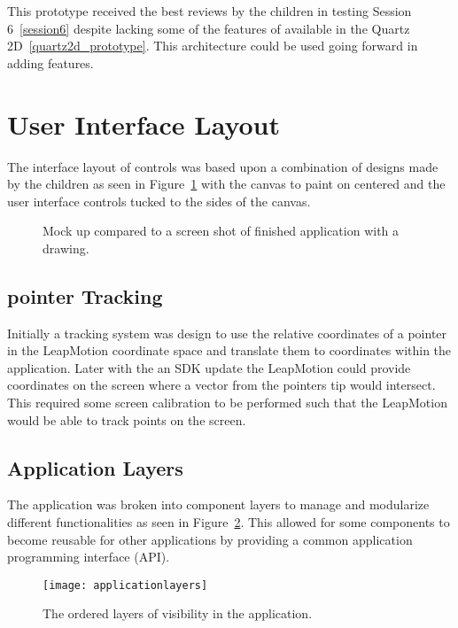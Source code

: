 This prototype received the best reviews by the children in testing Session 6~\ref{session6} despite lacking some of the features of available in the Quartz 2D~\ref{quartz2d_prototype}. This architecture could be used going forward in adding features.



\section{User Interface Layout}
The interface layout of controls was based upon a combination of designs made by the children as seen in Figure~\ref{fig:LeapPaintScreenshot} with the canvas to paint on centered and the user interface controls tucked to the sides of the canvas. 


\begin{figure}
\centering     %
{}
\caption{Mock up compared to a screen shot of finished application with a drawing. }
\label{fig:LeapPaintScreenshot}
\end{figure}



\subsection{pointer Tracking}
Initially a tracking system was design to use the relative coordinates of a pointer in the LeapMotion coordinate space and translate them to coordinates within the application. Later with the an SDK update the LeapMotion could provide coordinates on the screen where a vector from the pointers tip would intersect. This required some screen calibration to be performed such that the LeapMotion would be able to track points on the screen. 

\subsection{Application Layers}
The application was broken into component layers to manage and modularize different functionalities as seen in Figure~\ref{fig:applicationlayers}. This allowed for some components to become reusable for other applications by providing a common application programming interface (API). 

\begin{figure}
\centering
\texttt{[image: applicationlayers]}
\caption{The ordered layers of visibility in the application. }
\label{fig:applicationlayers}
\end{figure}

